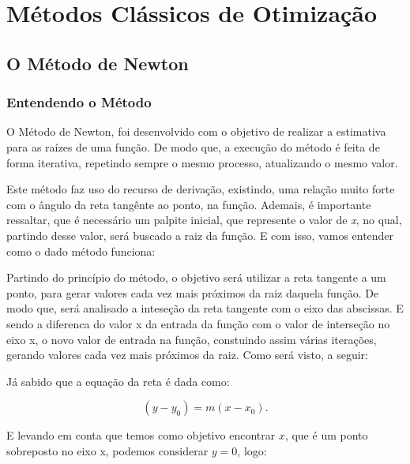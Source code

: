 

\chapter{\Large{Métodos Clássicos de Otimização}}\label{chp:2}


\section{{O Método de Newton}}

\hspace{0.8cm}

\subsection{Entendendo o Método}


O Método de Newton, foi desenvolvido com o objetivo de realizar a estimativa
para as raízes de uma função. De modo que, a execução do método é feita de
forma iterativa, repetindo sempre o mesmo processo, atualizando o mesmo valor.

Este método faz uso do recurso de derivação, existindo, uma relação muito
forte com o ângulo da reta tangênte ao ponto, na função. Ademais, é
importante ressaltar, que é necessário um palpite inicial, que represente
o valor de \textit{x}, no qual, partindo desse valor, será buscado a raiz da
função. E com isso, vamos entender como o dado método funciona:

Partindo do princípio do método, o objetivo será utilizar a reta tangente a um
ponto, para gerar valores cada vez mais próximos da raiz daquela função. De
modo que, será analisado a inteseção da reta tangente com o eixo das
abscissas. E sendo a diferenca do valor x da entrada da função com o valor de
interseção no eixo x, o novo valor de entrada na função, constuindo assim
várias iterações, gerando valores cada vez mais próximos da raiz. Como será
visto, a seguir:

Já sabido que a equação da reta é dada como:

\begin{equation}
    (y-y_0)=m(x-x_0).
\end{equation}

E levando em conta que temos como objetivo encontrar $x$, que é um ponto
sobreposto no eixo x, podemos considerar $y=0$, logo:

